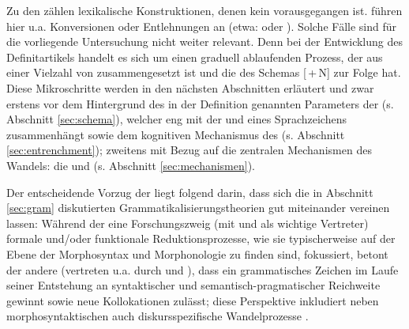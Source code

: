 \noindent
Zu den  zählen lexikalische Konstruktionen, denen kein  vorausgegangen ist. \textcite[3]{Traugott2013} führen hier u.a. Konversionen oder Entlehnungen an (etwa:  oder ). Solche Fälle sind für die vorliegende Untersuchung nicht weiter relevant. Denn bei der Entwicklung des Definitartikels handelt es sich um einen graduell ablaufenden Prozess, der aus einer Vielzahl von  zusammengesetzt ist und die  des Schemas  [\,+\,N]  zur Folge hat. Diese Mikroschritte werden in den nächsten Abschnitten erläutert und zwar erstens vor dem Hintergrund des in der Definition genannten Parameters der  (s. Abschnitt \ref{sec:schema}), welcher eng mit der  und  eines Sprachzeichens zusammenhängt sowie dem kognitiven Mechanismus des   (s.  Abschnitt \ref{sec:entrenchment}); zweitens mit Bezug auf die zentralen Mechanismen des Wandels: die  und  (s. Abschnitt \ref{sec:mechanismen}). 

Der entscheidende Vorzug der  liegt \textcite[60--62]{Traugott2015} folgend darin, dass sich die in Abschnitt \ref{sec:gram}  diskutierten Grammatikalisierungstheorien gut miteinander vereinen lassen: Während der eine Forschungszweig (mit \citealt{Lehmann1995} und \citealt{Haspelmath2004} als wichtige Vertreter) formale und/\-oder funktionale Reduktionsprozesse, wie sie typischerweise auf der Ebene der Morphosyntax und Morphonologie zu finden sind, fokussiert, betont der andere (vertreten u.a. durch \citealt{Himmelmann2004} und \citealt{Croft2006}), dass ein grammatisches Zeichen im Laufe seiner Entstehung an syntaktischer und semantisch-pragmatischer Reichweite gewinnt sowie neue Kollokationen zulässt; diese Perspektive inkludiert neben morphosyntaktischen auch diskursspezifische Wandelprozesse \parencite[vgl. den Begriff der  für die Entwicklung von Diskursmarkern bei][]{Auer2005}. 


